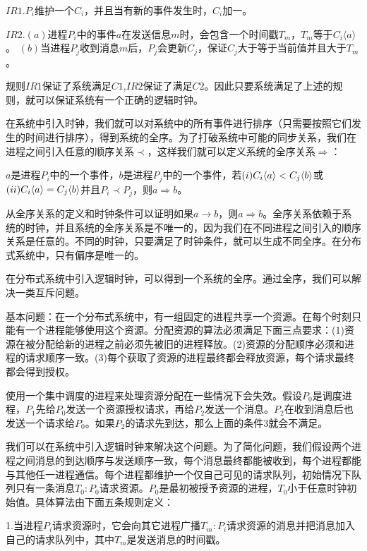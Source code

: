 \documentclass[UTF8]{article}
\begin{document}
	$IR1$.$P_i$维护一个$C_i$，并且当有新的事件发生时，$C_i$加一。

	$IR2$.\quad$(a)$进程$P_i$中的事件$a$在发送信息$m$时，会包含一个时间戳$T_m$，$T_m$等于$C_i \langle a \rangle$。
		 \quad$(b)$当进程$P_j$收到消息$m$后，$P_j$会更新$C_j$，保证$C_j$大于等于当前值并且大于$T_m$。

	规则$IR1$保证了系统满足$C1$,$IR2$保证了满足$C2$。因此只要系统满足了上述的规则，就可以保证系统有一个正确的逻辑时钟。

	在系统中引入时钟，我们就可以对系统中的所有事件进行排序（只需要按照它们发生的时间进行排序），得到系统的全序。为了打破系统中可能的同步关系，我们在进程之间引入任意的顺序关系$\prec$，这样我们就可以定义系统的全序关系$\Rightarrow$：
	
	$a$是进程$P_i$中的一个事件，$b$是进程$P_j$中的一个事件，若$(\romannumeral1)C_i\langle a \rangle < C_j \langle b \rangle$或$(\romannumeral2) C_i\langle a \rangle = C_j \langle b \rangle$并且$P_i \prec P_j$，则$a \Rightarrow b$。

	从全序关系的定义和时钟条件可以证明如果$a \rightarrow b$，则$a \Rightarrow b$。全序关系依赖于系统的时钟，并且系统的全序关系是不唯一的，因为我们在不同进程之间引入的顺序关系是任意的。不同的时钟，只要满足了时钟条件，就可以生成不同全序。在分布式系统中，只有偏序是唯一的。

	在分布式系统中引入逻辑时钟，可以得到一个系统的全序。通过全序，我们可以解决一类互斥问题。

	基本问题：在一个分布式系统中，有一组固定的进程共享一个资源。在每个时刻只能有一个进程能够使用这个资源。分配资源的算法必须满足下面三点要求：(1)资源在被分配给新的进程之前必须先被旧的进程释放。(2)资源的分配顺序必须和进程的请求顺序一致。(3)每个获取了资源的进程最终都会释放资源，每个请求最终都会得到授权。
	
	使用一个集中调度的进程来处理资源分配在一些情况下会失效。假设$P_0$是调度进程，$P_1$先给$P_0$发送一个资源授权请求，再给$P_2$发送一个消息。$P_2$在收到消息后也发送一个请求给$P_0$。如果$P_2$的请求先到达，那么上面的条件3就会不满足。
	
	我们可以在系统中引入逻辑时钟来解决这个问题。为了简化问题，我们假设两个进程之间消息的到达顺序与发送顺序一致，每个消息最终都能被收到，每个进程都能与其他任一进程通信。每个进程都维护一个仅自己可见的请求队列，初始情况下队列只有一条消息$T_0:P_0$请求资源。$P_0$是最初被授予资源的进程，$T_0$小于任意时钟初始值。具体算法由下面五条规则定义：

	1.当进程$P_i$请求资源时，它会向其它进程广播$T_m:P_i$请求资源的消息并把消息加入自己的请求队列中，其中$T_m$是发送消息的时间戳。
\end{document}
